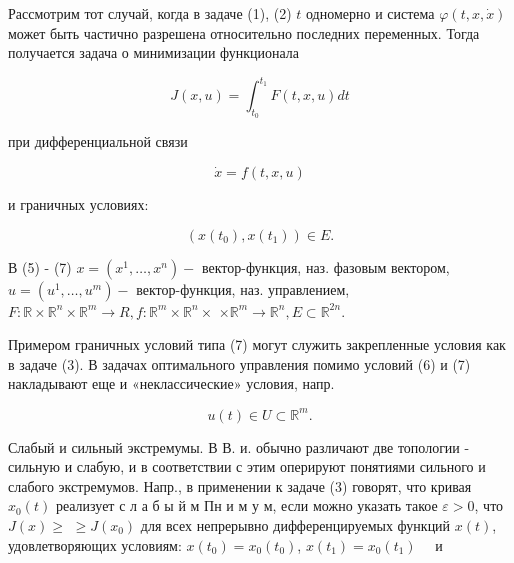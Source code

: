 \documentclass[10pt]{article}
\begin{document}
Рассмотрим тот случай, когда в задаче (1), (2) $t$ одномерно и система $\varphi(t, x, \dot{x})$ может быть частично разрешена относительно последних переменных. Тогда получается задача о минимизации функционала



\[

J(x, u)=\int_{t_{0}}^{t_{1}} F(t, x, u) d t

\]



при дифференциальной связи



\[

\dot{x}=f(t, x, u)

\]



и граничных условиях:



\[

\left(x\left(t_{0}\right), x\left(t_{1}\right)\right) \in E .

\]



В (5) - (7) $x=\left(x^{1}, \ldots, x^{n}\right)-$ вектор-функция, наз. фазовым вектором, $u=\left(u^{1}, \ldots, u^{m}\right)-$ вектор-функция, наз. управлением, $F: \mathbb{R} \times \mathbb{R}^{n} \times \mathbb{R}^{m} \rightarrow R, f: \mathbb{R}^{m} \times \mathbb{R}^{n} \times$ $\times \mathbb{R}^{m} \rightarrow \mathbb{R}^{n}, E \subset \mathbb{R}^{2 n}$.



Примером граничных условий типа (7) могут служить закрепленные условия как в задаче (3). В задачах оптимального управления помимо условий (6) и (7) накладывают еще и «неклассические» условия, напр.



\[

u(t) \in U \subset \mathbb{R}^{m} .

\]



Слабый и сильный экстремумы. В В. и. обычно различают две топологии - сильную и слабую, и в соответствии с этим оперируют понятиями сильного и слабого экстремумов. Напр., в применении к задаче (3) говорят, что кривая $x_{0}(t)$ реализует с л а б ы й м Пн и м у м, если можно указать такое $\varepsilon>0$, что $J(x) \geqslant$ $\geqslant J\left(x_{0}\right)$ для всех непрерывно дифференцируемых функций $x(t)$, удовлетворяющих условиям: $x\left(t_{0}\right)=x_{0}\left(t_{0}\right)$, $x\left(t_{1}\right)=x_{0}\left(t_{1}\right) \quad$ и
\end{document}
